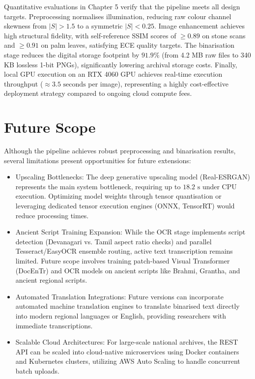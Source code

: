 Quantitative evaluations in Chapter 5 verify that the pipeline meets all design targets. Preprocessing normalises illumination, reducing raw colour channel skewness from $|S| > 1.5$ to a symmetric $|S| < 0.25$. Image enhancement achieves high structural fidelity, with self-reference SSIM scores of $\ge 0.89$ on stone scans and $\ge 0.91$ on palm leaves, satisfying ECE quality targets. The binarisation stage reduces the digital storage footprint by $91.9\%$ (from 4.2 MB raw files to 340 KB lossless 1-bit PNGs), significantly lowering archival storage costs. Finally, local GPU execution on an RTX 4060 GPU achieves real-time execution throughput ($\approx 3.5\text{ seconds}$ per image), representing a highly cost-effective deployment strategy compared to ongoing cloud compute fees.

\section{Future Scope}

Although the pipeline achieves robust preprocessing and binarisation results, several limitations present opportunities for future extensions:
\begin{itemize}
	\item Upscaling Bottlenecks: The deep generative upscaling model (Real-ESRGAN) represents the main system bottleneck, requiring up to $18.2\text{ s}$ under CPU execution. Optimizing model weights through tensor quantisation or leveraging dedicated tensor execution engines (ONNX, TensorRT) would reduce processing times.
	
	\item Ancient Script Training Expansion: While the OCR stage implements script detection (Devanagari vs. Tamil aspect ratio checks) and parallel Tesseract/EasyOCR ensemble routing, active text transcription remains limited. Future scope involves training patch-based Visual Transformer (DocEnTr) and OCR models on ancient scripts like Brahmi, Grantha, and ancient regional scripts.
	
	\item Automated Translation Integrations: Future versions can incorporate automated machine translation engines to translate binarised text directly into modern regional languages or English, providing researchers with immediate transcriptions.
	
	\item Scalable Cloud Architectures: For large-scale national archives, the REST API can be scaled into cloud-native microservices using Docker containers and Kubernetes clusters, utilizing AWS Auto Scaling to handle concurrent batch uploads.
\end{itemize}

